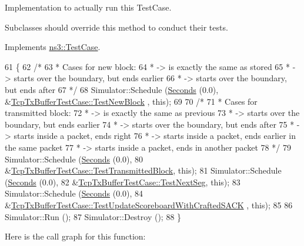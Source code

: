 Implementation to actually run this Test\+Case. 

Subclasses should override this method to conduct their tests. 

Implements \hyperlink{classns3_1_1TestCase_a8ff74680cf017ed42011e4be51917a24}{ns3\+::\+Test\+Case}.


\begin{DoxyCode}
61 \{
62   \textcolor{comment}{/*}
63 \textcolor{comment}{   * Cases for new block:}
64 \textcolor{comment}{   * -> is exactly the same as stored}
65 \textcolor{comment}{   * -> starts over the boundary, but ends earlier}
66 \textcolor{comment}{   * -> starts over the boundary, but ends after}
67 \textcolor{comment}{   */}
68   Simulator::Schedule (\hyperlink{group__timecivil_ga33c34b816f8ff6628e33d5c8e9713b9e}{Seconds} (0.0), &\hyperlink{classTcpTxBufferTestCase_a2b058225bf6a55a7e80bca5d1dc93f7a}{TcpTxBufferTestCase::TestNewBlock}
      , \textcolor{keyword}{this});
69 
70   \textcolor{comment}{/*}
71 \textcolor{comment}{   * Cases for transmitted block:}
72 \textcolor{comment}{   * -> is exactly the same as previous}
73 \textcolor{comment}{   * -> starts over the boundary, but ends earlier}
74 \textcolor{comment}{   * -> starts over the boundary, but ends after}
75 \textcolor{comment}{   * -> starts inside a packet, ends right}
76 \textcolor{comment}{   * -> starts inside a packet, ends earlier in the same packet}
77 \textcolor{comment}{   * -> starts inside a packet, ends in another packet}
78 \textcolor{comment}{   */}
79   Simulator::Schedule (\hyperlink{group__timecivil_ga33c34b816f8ff6628e33d5c8e9713b9e}{Seconds} (0.0),
80                        &\hyperlink{classTcpTxBufferTestCase_a088069951796a97ab17f7a6a9996034d}{TcpTxBufferTestCase::TestTransmittedBlock},
       \textcolor{keyword}{this});
81   Simulator::Schedule (\hyperlink{group__timecivil_ga33c34b816f8ff6628e33d5c8e9713b9e}{Seconds} (0.0),
82                        &\hyperlink{classTcpTxBufferTestCase_a87a6f679a0da25966b57cd415b03a268}{TcpTxBufferTestCase::TestNextSeg}, \textcolor{keyword}{this});
83   Simulator::Schedule (\hyperlink{group__timecivil_ga33c34b816f8ff6628e33d5c8e9713b9e}{Seconds} (0.0),
84                        &\hyperlink{classTcpTxBufferTestCase_ad18852b35db54711dd66d6738a9e5604}{TcpTxBufferTestCase::TestUpdateScoreboardWithCraftedSACK}
      , \textcolor{keyword}{this});
85 
86   Simulator::Run ();
87   Simulator::Destroy ();
88 \}
\end{DoxyCode}


Here is the call graph for this function\+:


